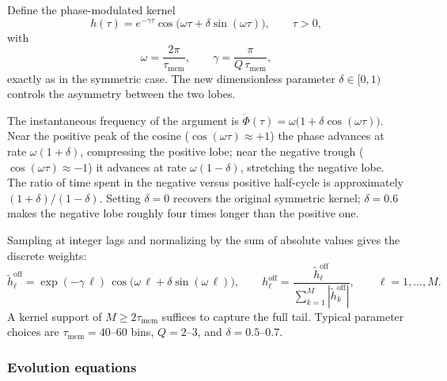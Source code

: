\documentclass[11pt]{article}
\begin{document}
Define the phase-modulated kernel
\begin{equation}
  h(\tau) = e^{-\gamma\tau}
            \cos\!\bigl(\omega\tau + \delta\sin(\omega\tau)\bigr),
  \qquad \tau>0,
  \label{eq:asym_kernel}
\end{equation}
with
\begin{equation}
  \omega = \frac{2\pi}{\tau_{\mathrm{mem}}},
  \qquad
  \gamma = \frac{\pi}{Q\,\tau_{\mathrm{mem}}},
  \label{eq:asym_params}
\end{equation}
exactly as in the symmetric case.  The new dimensionless parameter
$\delta\in[0,1)$ controls the asymmetry between the two lobes.

The instantaneous frequency of the argument is
$\dot\Phi(\tau)=\omega\bigl(1+\delta\cos(\omega\tau)\bigr)$.
Near the positive peak of the cosine
($\cos(\omega\tau)\approx+1$) the phase advances at rate
$\omega(1+\delta)$, compressing the positive lobe; near the
negative trough ($\cos(\omega\tau)\approx-1$) it advances at rate
$\omega(1-\delta)$, stretching the negative lobe.  The ratio of
time spent in the negative versus positive half-cycle is
approximately $(1+\delta)/(1-\delta)$.  Setting $\delta=0$
recovers the original symmetric kernel; $\delta=0.6$ makes the
negative lobe roughly four times longer than the positive one.

Sampling at integer lags and normalizing by the sum of absolute
values gives the discrete weights:
\begin{equation}
  \tilde{h}^{\mathrm{off}}_\ell
  = \exp(-\gamma\,\ell)\,
    \cos\!\bigl(\omega\,\ell+\delta\sin(\omega\,\ell)\bigr),
  \qquad
  h^{\mathrm{off}}_\ell
  = \frac{\tilde{h}^{\mathrm{off}}_\ell}
         {\sum_{k=1}^{M}|\tilde{h}^{\mathrm{off}}_k|},
  \qquad \ell=1,\dots,M.
  \label{eq:asym_mem_kernel}
\end{equation}
A kernel support of $M\geq 2\tau_{\mathrm{mem}}$ suffices to
capture the full tail.  Typical parameter choices are
$\tau_{\mathrm{mem}}=40$--$60$ bins, $Q=2$--$3$, and
$\delta=0.5$--$0.7$. 
\subsubsection{Evolution equations}
\end{document}
